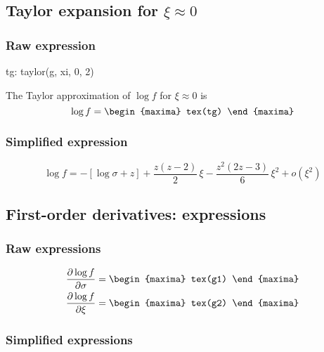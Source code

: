 \subsection{Taylor expansion for $\xi \approx 0$}
\subsubsection*{Raw expression}
\begin{maxima}
  tg: taylor(g, xi, 0, 2)
\end{maxima}
The Taylor approximation of $\log f$ for $\xi \approx  0$ is 
{\color{MonVertF}
  $$
  \log f =
\begin{maxima}
  tex(tg)
\end{maxima}
$$
}

\subsubsection*{Simplified expression}

{\color{red}
  \begin{equation*}
    \log f = - \left[ \log \sigma + z\right] + \frac{z (z - 2) }{2} \, \xi -
    \frac{z^2 (2 z - 3)}{6} \, \xi^2 + o(\xi^2)
  \end{equation*}
}
  
\subsection{First-order derivatives: expressions}
\subsubsection*{Raw expressions}

{\color{MonVertF}
\begin{align*}
\frac{\partial \log f}{\partial \sigma}  &=
\begin{maxima}
 tex(g1)
\end{maxima}
\\
\frac{\partial \log f}{\partial \xi} &=
\begin{maxima}
 tex(g2)
\end{maxima}
\end{align*}
}

\subsubsection*{Simplified expressions}

